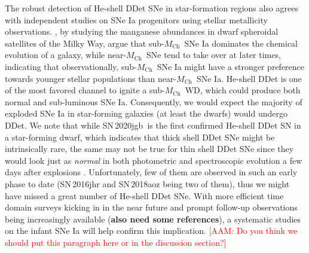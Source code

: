 \documentclass[twocolumn]{aastex631}
\newcommand{\sn}{SN\,2020jgb}
\newcommand{\Mch}{$M_\mathrm{Ch}$}
\newcommand{\adam}[1]{\textcolor{red}{[AAM: #1]}}
\begin{document}
The robust detection of He-shell DDet SNe in star-formation regions also agrees with independent studies on SNe Ia progenitors using stellar metallicity observations. \citet{de_los_reyes_manganese_2020}, by studying the manganese abundances in dwarf spheroidal satellites of the Milky Way, argue that sub-\Mch\ SNe Ia dominates the chemical evolution of a galaxy, while near-\Mch\ SNe tend to take over at later times, indicating that observationally, sub-\Mch\ SNe Ia might have a stronger preference towards younger stellar populations than near-\Mch\ SNe Ia. He-shell DDet is one of the most favored channel to ignite a sub-\Mch\ WD, which could produce both normal and sub-luminous SNe Ia. Consequently, we would expect the majority of exploded SNe Ia in star-forming galaxies (at least the dwarfs) would undergo DDet. We note that while \sn\ is the first confirmed He-shell DDet SN in a star-forming dwarf, which indicates that thick shell DDet SNe might be intrinsically rare, the same may not be true for thin shell DDet SNe since they would look just as {\it normal} in both photometric and spectroscopic evolution a few days after explosions \citep{Ni_2022}. Unfortunately, few of them are observed in such an early phase to date (SN\,2016jhr and SN\,2018aoz being two of them), thus we might have missed a great number of He-shell DDet SNe. With more efficient time domain surveys kicking in in the near future and prompt follow-up observations being increasingly available (\textbf{also need some references}), a systematic studies on the infant SNe Ia will help confirm this implication. \adam{Do you think we should put this paragraph here or in the discussion section?}
\end{document}
